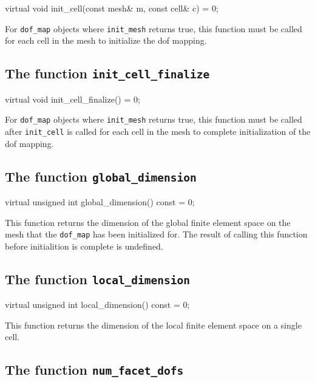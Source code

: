 \begin{code}
virtual void init_cell(const mesh& m,
                       const cell& c) = 0;
\end{code}

For \texttt{dof\_map} objects where \texttt{init\_mesh} returns true,
this function must be called for each cell in the mesh to initialize
the dof mapping.

\subsection{The function \texttt{init\_cell\_finalize}}

\begin{code}
virtual void init_cell_finalize() = 0;
\end{code}

For \texttt{dof\_map} objects where \texttt{init\_mesh} returns true,
this function must be called after \texttt{init\_cell} is called for
each cell in the mesh to complete initialization of the dof mapping.

\subsection{The function \texttt{global\_dimension}}

\begin{code}
virtual unsigned int global_dimension() const = 0;
\end{code}

This function returns the dimension of the global finite element space
on the mesh that the \texttt{dof\_map} has been initialized for. The
result of calling this function before initialition is complete is
undefined.

\subsection{The function \texttt{local\_dimension}}

\begin{code}
virtual unsigned int local_dimension() const = 0;
\end{code}

This function returns the dimension of the local finite element space
on a single cell.

\subsection{The function \texttt{num\_facet\_dofs}}

